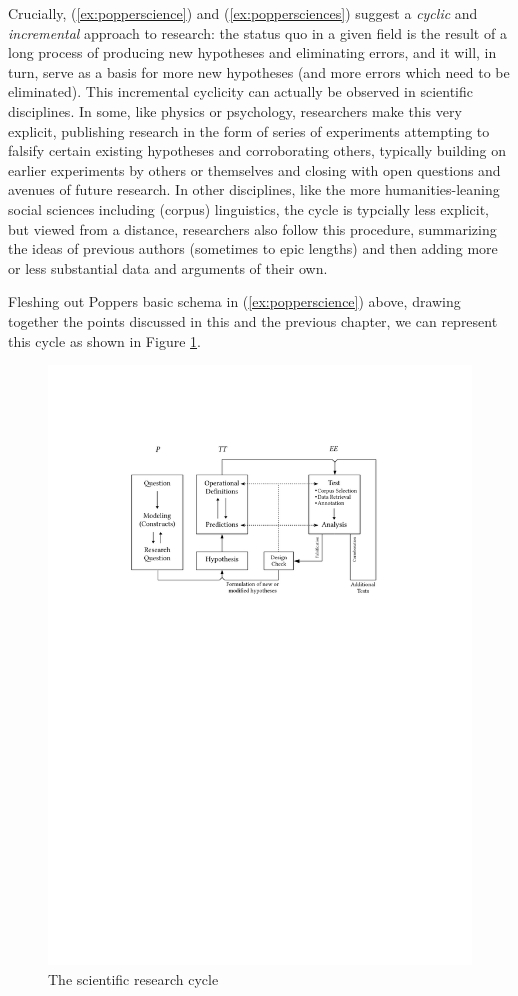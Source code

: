 Crucially, (\ref{ex:popperscience}) and (\ref{ex:poppersciences}) suggest a \emph{cyclic} and \emph{incremental} approach to research: the status quo in a given field is the result of a long process of producing new hypotheses and eliminating errors, and it will, in turn, serve as a basis for more new hypotheses (and more errors which need to be eliminated). This incremental cyclicity can actually be observed in scientific disciplines. In some, like physics or psychology, researchers make this very explicit, publishing research in the form of series of experiments attempting to falsify certain existing hypotheses and corroborating others, typically building on earlier experiments by others or themselves and closing with open questions and avenues of future research. In other disciplines, like the more humanities-leaning social sciences including (corpus) linguistics, the cycle is typcially less explicit, but viewed from a distance, researchers also follow this procedure, summarizing the ideas of previous authors (sometimes to epic lengths) and then adding more or less substantial data and arguments of their own.

Fleshing out Poppers basic schema in (\ref{ex:popperscience}) above, drawing together the points discussed in this and the previous chapter, we can represent this cycle as shown in Figure \ref{fig:researchcycle}.

\begin{figure}[!htbp]
\caption{The scientific research cycle}
\label{fig:researchcycle}
\includegraphics[scale=0.9]{figures/researchcycle}
\end{figure}

